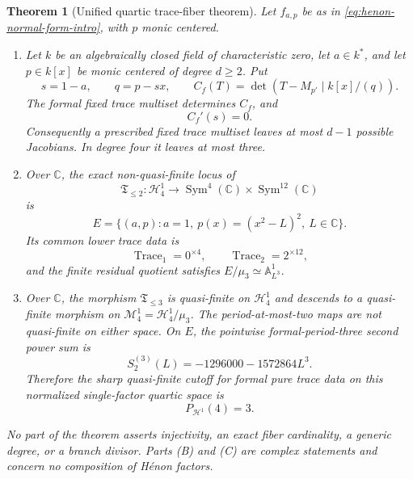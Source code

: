 \documentclass[11pt]{article}
\newtheorem{theorem}{Theorem}[section]
\theoremstyle{definition}
\newcommand{\C}{\mathbb C}
\newcommand{\A}{\mathbb A}
\newcommand{\Hn}{\mathcal H}
\newcommand{\Mn}{\mathcal M}
\newcommand{\Trace}{\operatorname{Trace}}
\newcommand{\Sym}{\operatorname{Sym}}
\begin{document}
\begin{theorem}[Unified quartic trace-fiber theorem]
\label{thm:unified}
Let $f_{a,p}$ be as in \eqref{eq:henon-normal-form-intro}, with $p$ monic centered.
\begin{enumerate}[label=\textnormal{(\Alph*)},leftmargin=2.5em]
\item Let $k$ be an algebraically closed field of characteristic zero, let $a\in k^*$, and let $p\in k[x]$ be monic centered of degree $d\ge 2$. Put
\[
s=1-a,\qquad q=p-sx,\qquad
C_f(T)=\det\!\left(T-M_{p'}\mid k[x]/(q)\right).
\]
The formal fixed trace multiset determines $C_f$, and
\begin{equation}
C_f'(s)=0.
\label{eq:headline-derivative}
\end{equation}
Consequently a prescribed fixed trace multiset leaves at most $d-1$ possible Jacobians. In degree four it leaves at most three.

\item Over $\C$, the exact non-quasi-finite locus of
\[
\mathfrak T_{\le2}:\Hn^1_4
\longrightarrow \Sym^4(\C)\times\Sym^{12}(\C)
\]
is
\begin{equation}
E=\{(a,p):a=1,\ p(x)=(x^2-L)^2,\ L\in\C\}.
\label{eq:headline-E}
\end{equation}
Its common lower trace data is
\[
\Trace_1=0^{\times4},\qquad
\Trace_2=2^{\times12},
\]
and the finite residual quotient satisfies $E/\mu_3\simeq\A^1_{L^3}$.

\item Over $\C$, the morphism $\mathfrak T_{\le3}$ is quasi-finite on $\Hn^1_4$ and descends to a quasi-finite morphism on $\Mn^1_4=\Hn^1_4/\mu_3$. The period-at-most-two maps are not quasi-finite on either space. On $E$, the pointwise formal-period-three second power sum is
\begin{equation}
S^{(3)}_2(L)=-1296000-1572864L^3.
\label{eq:headline-moment}
\end{equation}
Therefore the sharp quasi-finite cutoff for formal pure trace data on this normalized single-factor quartic space is
\[
P_{\Hn^1}(4)=3.
\]
\end{enumerate}
No part of the theorem asserts injectivity, an exact fiber cardinality, a generic degree, or a branch divisor. Parts \textnormal{(B)} and \textnormal{(C)} are complex statements and concern no composition of H\'enon factors.
\end{theorem}
\end{document}
